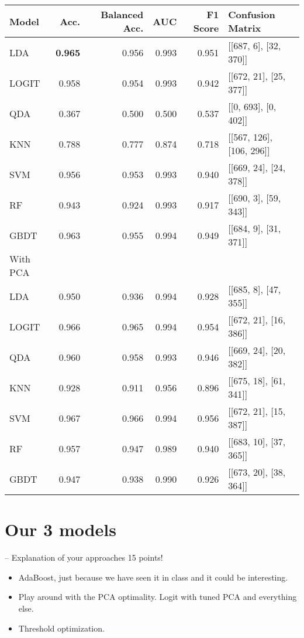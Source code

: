 \documentclass{article}
\begin{document}
\begin{tabular}{lrrrrl}
    \toprule
    Model & Acc. & Balanced Acc. & AUC & F1 Score & Confusion Matrix \\
    \midrule
    LDA & \textbf{0.965} & 0.956 & 0.993 & 0.951 & [[687, 6], [32, 370]] \\
    LOGIT & 0.958 & 0.954 & 0.993 & 0.942 & [[672, 21], [25, 377]] \\
    QDA & 0.367 & 0.500 & 0.500 & 0.537 & [[0, 693], [0, 402]] \\
    KNN & 0.788 & 0.777 & 0.874 & 0.718 & [[567, 126], [106, 296]] \\
    SVM & 0.956 & 0.953 & 0.993 & 0.940 & [[669, 24], [24, 378]] \\
    RF & 0.943 & 0.924 & 0.993 & 0.917 & [[690, 3], [59, 343]] \\
    GBDT & 0.963 & 0.955 & 0.994 & 0.949 & [[684, 9], [31, 371]] \\\midrule
    With PCA \\ \midrule
    LDA & 0.950 & 0.936 & 0.994 & 0.928 & [[685, 8], [47, 355]] \\
    LOGIT & 0.966 & 0.965 & 0.994 & 0.954 & [[672, 21], [16, 386]] \\
    QDA & 0.960 & 0.958 & 0.993 & 0.946 & [[669, 24], [20, 382]] \\
    KNN & 0.928 & 0.911 & 0.956 & 0.896 & [[675, 18], [61, 341]] \\
    SVM & 0.967 & 0.966 & 0.994 & 0.956 & [[672, 21], [15, 387]] \\
    RF & 0.957 & 0.947 & 0.989 & 0.940 & [[683, 10], [37, 365]] \\
    GBDT & 0.947 & 0.938 & 0.990 & 0.926 & [[673, 20], [38, 364]] \\
    \bottomrule
    \end{tabular}


\section{Our 3 models}\label{sec:1.3}
– Explanation of your approaches 15 points!
\begin{itemize}
    \item AdaBoost, just because we have seen it in class and it could be interesting.
    \item Play around with the PCA optimality. Logit with tuned PCA and everything else.
    \item Threshold optimization. 
\end{itemize}

\section{}
\end{document}
